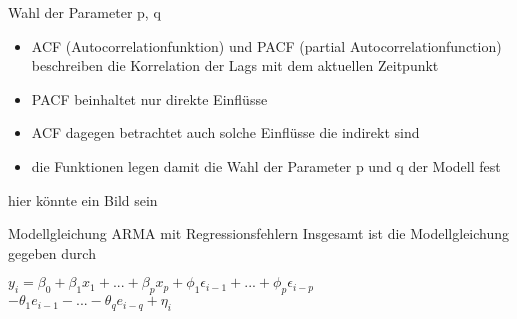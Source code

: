\begin{frame}{Wahl der Parameter p, q}
\begin{itemize}
\item ACF (Autocorrelationfunktion) und PACF (partial Autocorrelationfunction) beschreiben die Korrelation der Lags mit dem aktuellen Zeitpunkt
\item PACF beinhaltet nur direkte Einflüsse 
\item ACF dagegen betrachtet auch solche Einflüsse die indirekt sind
\item die Funktionen legen damit die Wahl der Parameter p und q der Modell fest
\end{itemize}
\begin{center}
hier könnte ein Bild sein
\end{center}
\end{frame}

\begin{frame}{Modellgleichung ARMA mit Regressionsfehlern}
Insgesamt ist die Modellgleichung gegeben durch
\begin{center}
$y_{i} = \beta_{0} + \beta_{1}x_{1} + ... + \beta_{p}x_{p} + \phi_{1}\epsilon_{i-1}+ ... + \phi_{p}\epsilon_{i-p}$ \\
$- \theta_{1}e_{i-1} - ... - \theta_{q}e_{i-q}  + \eta_{i}$
\end{center}
\end{frame}
